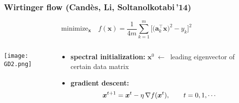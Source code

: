 \documentclass[compress,
mathserif,wide,%
]{beamer}
\begin{document}
\begin{frame}
\frametitle{Wirtinger flow (Cand\`es, Li, Soltanolkotabi\,'14)}

\[
\text{minimize}_{\bm{x}}\quad f(\bm{x})=\frac{1}{4m}\sum_{k=1}^{m}\Big[ \big(\bm{a}_{k}^{\top}\bm{x}\big)^{2}-y_{k} \Big]^{2}
\]


\pause

\vspace{-2em}


\begin{columns}
\begin{column}{0.3\textwidth}

\begin{center}
  \texttt{[image: GD2.png]}
\end{center}

\end{column}



\begin{column}{0.7\textwidth}

\begin{itemize}
\itemsep1em
\item {\bf spectral initialization:}  $\bm{x}^{0}~\leftarrow~$ leading eigenvector of certain data matrix
\pause
\item {\bf gradient descent:}  
\[
  \bm{x}^{t+1}= \bm{x}^t- \eta \, \nabla f(\bm{x}^t), \qquad t=0,1,\cdots
\]
\end{itemize}

\end{column}
\end{columns}

\end{frame}
\end{document}

